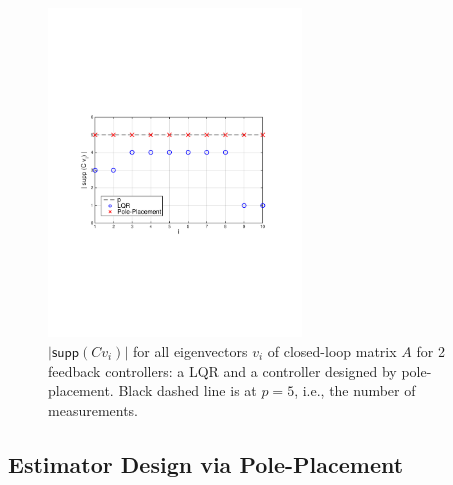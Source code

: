 \documentclass[../../thesis.tex]{subfiles}
\begin{document}
\begin{figure}[t]
\center
\includegraphics[width=0.6\textwidth]{chapters/se_linear/figures/supp_ev_2.pdf}
\caption{$ \lvert \textsf{supp} (C v_i) \rvert $ for all eigenvectors $v_i$ of closed-loop matrix $A$ for 2 feedback controllers: a LQR and a controller designed by pole-placement. Black dashed line is at $p = 5$, i.e., the number of measurements.}
\label{fig:ex_pole}
\end{figure}



\subsection{Estimator Design via Pole-Placement}
\end{document}
